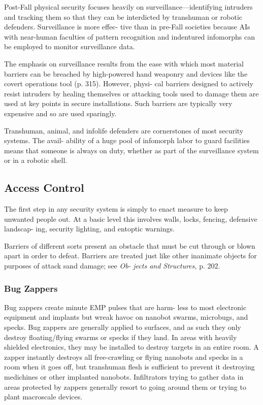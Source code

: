 Post-Fall physical security focuses heavily on 
surveillance—identifying intruders and tracking 
them so that they can be interdicted by transhuman 
or robotic defenders. Surveillance is more effec-
tive than in pre-Fall societies because AIs with 
near-human faculties of pattern recognition and 
indentured infomorphs can be employed to monitor 
surveillance data.

The emphasis on surveillance results from the ease 
with which most material barriers can be breached 
by high-powered hand weaponry and devices like 
the covert operations tool (p. 315). However, physi-
cal barriers designed to actively resist intruders by 
healing themselves or attacking tools used to damage 
them are used at key points in secure installations. 
Such barriers are typically very expensive and so are 
used sparingly.

Transhuman, animal, and infolife defenders are 
cornerstones of most security systems. The avail-
ability of a huge pool of infomorph labor to guard 
facilities means that someone is always on duty, 
whether as part of the surveillance system or in a 
robotic shell.

\subsection{Access Control}

The first step in any security system is simply to enact 
measure to keep unwanted people out. At a basic level 
this involves walls, locks, fencing, defensive landscap-
ing, security lighting, and entoptic warnings.

Barriers of different sorts present an obstacle that 
must be cut through or blown apart in order to 
defeat. Barriers are treated just like other inanimate 
objects for purposes of attack sand damage; see \textit{Ob-}
\textit{jects and Structures,} p. 202.

\subsubsection{Bug Zappers}

Bug zappers create minute EMP pulses that are harm-
less to most electronic equipment and implants but 
wreak havoc on nanobot swarms, microbugs, and 
specks. Bug zappers are generally applied to surfaces, 
and as such they only destroy floating/flying swarms 
or specks if they land. In areas with heavily shielded 
electronics, they may be installed to destroy targets 
in an entire room. A zapper instantly destroys all 
free-crawling or flying nanobots and specks in a room 
when it goes off, but transhuman flesh is sufficient to 
prevent it destroying medichines or other implanted 
nanobots. Infiltrators trying to gather data in areas 
protected by zappers generally resort to going around 
them or trying to plant macroscale devices.


